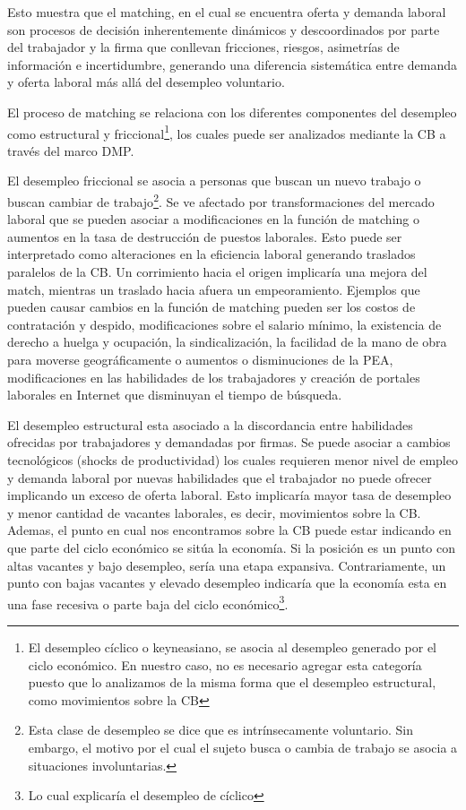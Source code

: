 \documentclass[12pt,oneside]{reedthesis}
\begin{document}
Esto muestra que el matching, en el cual se encuentra oferta y demanda laboral son procesos de decisión inherentemente dinámicos y descoordinados por parte del trabajador y la firma que conllevan fricciones, riesgos, asimetrías de información e incertidumbre, generando una diferencia sistemática entre demanda y oferta laboral más allá del desempleo voluntario.

El proceso de matching se relaciona con los diferentes componentes del desempleo como estructural y friccional\footnote{El desempleo cíclico o keyneasiano, se asocia al desempleo generado por el ciclo económico. En nuestro caso, no es necesario agregar esta categoría puesto que lo analizamos de la misma forma que el desempleo estructural, como movimientos sobre la CB}, los cuales puede ser analizados mediante la CB a través del marco DMP.

El desempleo friccional se asocia a personas que buscan un nuevo trabajo o buscan cambiar de trabajo\footnote{Esta clase de desempleo se dice que es intrínsecamente voluntario. Sin embargo, el motivo por el cual el sujeto busca o cambia de trabajo se asocia a situaciones involuntarias.}. Se ve afectado por transformaciones del mercado laboral que se pueden asociar a modificaciones en la función de matching o aumentos en la tasa de destrucción de puestos laborales. Esto puede ser interpretado como alteraciones en la eficiencia laboral generando traslados paralelos de la CB. Un corrimiento hacia el origen implicaría una mejora del match, mientras un traslado hacia afuera un empeoramiento. Ejemplos que pueden causar cambios en la función de matching pueden ser los costos de contratación y despido, modificaciones sobre el salario mínimo, la existencia de derecho a huelga y ocupación, la sindicalización, la facilidad de la mano de obra para moverse geográficamente o aumentos o disminuciones de la PEA, modificaciones en las habilidades de los trabajadores y creación de portales laborales en Internet que disminuyan el tiempo de búsqueda.

El desempleo estructural esta asociado a la discordancia entre habilidades ofrecidas por trabajadores y demandadas por firmas. Se puede asociar a cambios tecnológicos (shocks de productividad) los cuales requieren menor nivel de empleo y demanda laboral por nuevas habilidades que el trabajador no puede ofrecer implicando un exceso de oferta laboral. Esto implicaría mayor tasa de desempleo y menor cantidad de vacantes laborales, es decir, movimientos sobre la CB. Ademas, el punto en cual nos encontramos sobre la CB puede estar indicando en que parte del ciclo económico se sitúa la economía. Si la posición es un punto con altas vacantes y bajo desempleo, sería una etapa expansiva. Contrariamente, un punto con bajas vacantes y elevado desempleo indicaría que la economía esta en una fase recesiva o parte baja del ciclo económico\footnote{Lo cual explicaría el desempleo de cíclico}.
\end{document}
